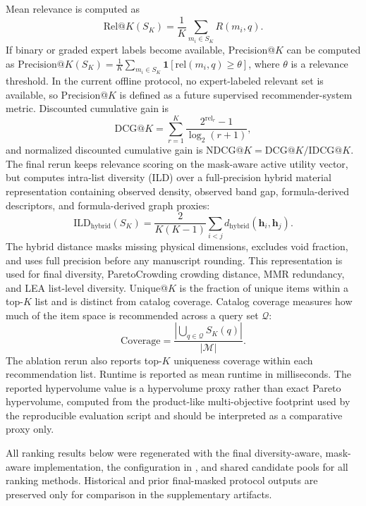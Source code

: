 \documentclass[12pt,a4paper]{article}
\begin{document}
Mean relevance is computed as
\begin{equation}
  \mathrm{Rel}@K(S_K) = \frac{1}{K}\sum_{m_i \in S_K} R(m_i, q).
\end{equation}
If binary or graded expert labels become available, Precision@$K$ can be computed as $\mathrm{Precision}@K(S_K) = \frac{1}{K}\sum_{m_i\in S_K}\mathbf{1}[\mathrm{rel}(m_i,q)\geq\theta]$, where $\theta$ is a relevance threshold. In the current offline protocol, no expert-labeled relevant set is available, so Precision@$K$ is defined as a future supervised recommender-system metric. Discounted cumulative gain is
\begin{equation}
  \mathrm{DCG}@K = \sum_{r=1}^{K}\frac{2^{\mathrm{rel}_r}-1}{\log_2(r+1)},
\end{equation}
and normalized discounted cumulative gain is $\mathrm{NDCG}@K = \mathrm{DCG}@K / \mathrm{IDCG}@K$. The final rerun keeps relevance scoring on the mask-aware active utility vector, but computes intra-list diversity (ILD) over a full-precision hybrid material representation containing observed density, observed band gap, formula-derived descriptors, and formula-derived graph proxies:
\begin{equation}
  \mathrm{ILD}_{\mathrm{hybrid}}(S_K) = \frac{2}{K(K-1)}\sum_{i<j}d_{\mathrm{hybrid}}(\mathbf{h}_i,\mathbf{h}_j).
\end{equation}
The hybrid distance masks missing physical dimensions, excludes void fraction, and uses full precision before any manuscript rounding. This representation is used for final diversity, ParetoCrowding crowding distance, MMR redundancy, and LEA list-level diversity. Unique@$K$ is the fraction of unique items within a top-$K$ list and is distinct from catalog coverage.
Catalog coverage measures how much of the item space is recommended across a query set $\mathcal{Q}$:
\begin{equation}
  \mathrm{Coverage} = \frac{\left|\bigcup_{q\in\mathcal{Q}}S_K(q)\right|}{|\mathcal{M}|}.
\end{equation}
The ablation rerun also reports top-$K$ uniqueness coverage within each recommendation list. Runtime is reported as mean runtime in milliseconds. The reported hypervolume value is a hypervolume proxy rather than exact Pareto hypervolume, computed from the product-like multi-objective footprint used by the reproducible evaluation script and should be interpreted as a comparative proxy only.

All ranking results below were regenerated with the final diversity-aware, mask-aware implementation, the configuration in , and shared candidate pools for all ranking methods. Historical and prior final-masked protocol outputs are preserved only for comparison in the supplementary artifacts.
\end{document}
